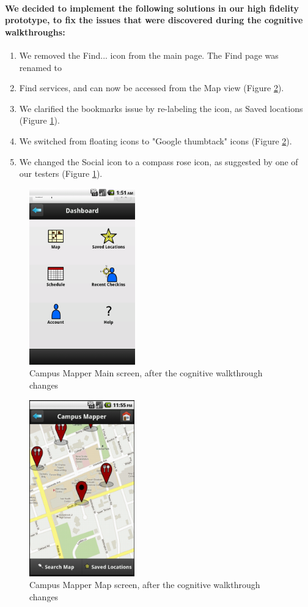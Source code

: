 \documentclass{report}
\begin{document}
    \paragraph{We decided to implement the following solutions in our high
    fidelity prototype, to fix the issues that were discovered during the cognitive
    walkthroughs:}
    \begin{enumerate}
    \item We removed the Find... icon from the main page. The Find page was renamed to
    \item Find services, and can now be accessed from the Map view (Figure
    \ref{fig:cog-map}).
    \item We clarified the bookmarks issue by re-labeling the icon, as Saved locations
    (Figure \ref{fig:cog-dashboard}).
    \item We switched from floating icons to "Google thumbtack" icons (Figure
    \ref{fig:cog-map}).
    \item We changed the Social icon to a compass rose icon, as suggested by one of our
    testers (Figure \ref{fig:cog-dashboard}).
    \end{enumerate}
    \begin{figure}
        \centering
            \includegraphics[height=3in]{img/cw_dashboard.png}
        \caption{Campus Mapper Main screen, after the cognitive walkthrough changes} 
        \label{fig:cog-dashboard} 
    \end{figure}
    \begin{figure}
        \centering
            \includegraphics[height=3in]{img/cw_map-restaurant.png}
        \caption{Campus Mapper Map screen, after the cognitive walkthrough changes} 
        \label{fig:cog-map} 
    \end{figure}
\end{document}
